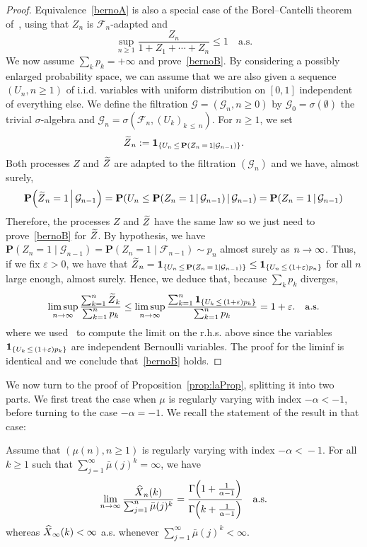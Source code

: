 \documentclass[AHL,Unicode,longabstracts,published]{cedram}
\newcommand{\ind}[1]{\mathbf{1}_{\left\{#1\right\}}}
\renewcommand{\P}{\mathbf{P}}
\newcommand{\clF}{\mathcal{F}}
\newcommand{\clG}{\mathcal{G}}
\let\originalleft\left
\let\originalright\right
\renewcommand{\left}{\mathopen{}\mathclose\bgroup\originalleft}
\renewcommand{\right}{\aftergroup\egroup\originalright}
\renewcommand*{\to}{\mathchoice{\longrightarrow}{\rightarrow}{\rightarrow}{\rightarrow}}
\let\oldtilde\tilde
\renewcommand*{\tilde}[1]{\mathchoice{\widetilde{#1}}{\widetilde{#1}}{\oldtilde{#1}}{\oldtilde{#1}}}
\let\oldhat\hat
\renewcommand*{\hat}[1]{\mathchoice{\widehat{#1}}{\widehat{#1}}{\oldhat{#1}}{\oldhat{#1}}}
\begin{document}
\begin{proof}
Equivalence~\eqref{bernoA} is also a special case of the Borel--Cantelli theorem of~\cite{Chen78}, using that $Z_n$ is $\clF_n$-adapted and
\[
\sup_{n \geq 1} \frac{Z_n}{1 + Z_1 + \cdots + Z_n} \leq 1 \quad \text{a.s.}
\]
We now assume $\sum_k p_k = +\infty$ and prove~\eqref{bernoB}. By considering a possibly enlarged probability space, we can assume that we are also given a sequence $(U_n, n\geq 1)$ of i.i.d. variables with uniform distribution on $[0,1]$ independent of everything else. We define the filtration $\clG = (\clG _n, n\geq 0)$ by $\clG _0 = \sigma(\emptyset)$ the trivial $\sigma$-algebra and $\clG _n = \sigma(\clF_n, (U_k)_{k\,\leq\,n})$. For $n\geq 1$, we set
\[
\tilde{Z}_{n}
:= \ind{U_{n}\,\leq\,\P(Z_{n}\,=\,1\mid \clG _{n-1})}.
\]
Both processes $Z$ and $\tilde{Z}$ are adapted to the filtration $(\clG _n)$ and we have, almost surely,
\[
\P\left(\tilde{Z}_{n} = 1 \, \middle| \, \clG _{n-1}\right) = \P\left(U_{n} \leq \P\left(Z_{n} = 1\,\middle|\, \clG _{n-1}\right) \, \middle| \, \clG _{n-1}\right) = \P\left(Z_{n} = 1 \, \middle| \, \clG _{n-1}\right)
\]
Therefore, the processes $Z$ and $\tilde{Z}$ have the same law so we just need to prove~\eqref{bernoB} for $\tilde{Z}$. By hypothesis, we have $\P(Z_{n} = 1\mid \clG _{n-1}) = \P(Z_{n} = 1\mid \clF_{n-1}) \sim p_n$ almost surely as $n\to\infty$. Thus, if we fix $\varepsilon >0$, we have that $\tilde{Z}_n = \ind{U_{n} \,\leq\,\P(Z_{n}\,=\,1\mid \clG _{n-1})} \leq \ind{U_n\,\leq\, (1+\varepsilon)p_n}$ for all $n$ large enough, almost surely. Hence, we deduce that, because $\sum_k p_k$ diverges,
\[
\limsup_{n\to\infty} \frac{\sum_{k=1}^n \tilde{Z}_k}{\sum_{k=1}^n p_k} \leq \limsup_{n\to\infty} \frac{\sum_{k=1}^n \ind{U_k\,\leq\,(1+\varepsilon)p_k}}{\sum_{k=1}^n p_k} = 1+\varepsilon.\quad\text{a.s.}
\]
where we used~\cite[Theorem~2.3.8]{Durrett2010} to compute the limit on the r.h.s. above since the variables $\ind{U_{k} \,\leq\,(1+\varepsilon)p_k}$ are independent Bernoulli variables. The proof for the liminf is identical and we conclude that~\eqref{bernoB} holds.
\end{proof}



We now turn to the proof of Proposition~\ref{prop:laProp}, splitting it into two parts. We first treat the case when $\mu$ is regularly varying with index $-\alpha < -1$, before turning to the case $-\alpha = -1$. We recall the statement of the result in that case:
\begin{lemm}\label{lem:alphaPos}%
\!\!
Assume that $(\mu(n), n\!\geq\! 1)$ is regularly varying with index $-\alpha\! <\! -1$. For all $k\geq 1$ such that $\sum_{j = 1}^\infty \bar{\mu}(j)^k = \infty$, we have
\begin{equation}\label{eqn:growthRatelemma}
\lim_{n \to \infty} \frac{\hat{X}_n(k)}{\sum_{j=1}^n \bar{\mu}(j)^k} = \frac{\Gamma\left(1 + \frac{1}{\alpha - 1}\right)}{\Gamma\left(k + \frac{1}{\alpha -1} \right)} \quad \text{a.s.}
\end{equation}
whereas $\hat{X}_\infty(k) < \infty$ a.s. whenever $\sum_{j = 1}^\infty \bar{\mu}(j)^k < \infty$.
\end{lemm}
\end{document}
